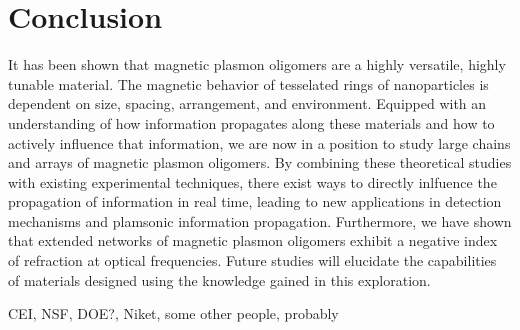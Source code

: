 \documentclass[journal=apchd5,manuscript=article]{achemso}
\begin{document}
\section{Conclusion}
It has been shown that magnetic plasmon oligomers are a highly versatile, highly tunable material. The magnetic behavior of tesselated rings of nanoparticles is dependent on size, spacing, arrangement, and environment. Equipped with an understanding of how information propagates along these materials and how to actively influence that information, we are now in a position to study large chains and arrays of magnetic plasmon oligomers. By combining these theoretical studies with existing experimental techniques, there exist ways to directly inlfuence the propagation of information in real time, leading to new applications in detection mechanisms and plamsonic information propagation. Furthermore, we have shown that extended networks of magnetic plasmon oligomers exhibit a negative index of refraction at optical frequencies. Future studies will elucidate the capabilities of materials designed using the knowledge gained in this exploration.

\begin{acknowledgement}
CEI, NSF, DOE?, Niket, some other people, probably
\end{acknowledgement}


\end{document}

